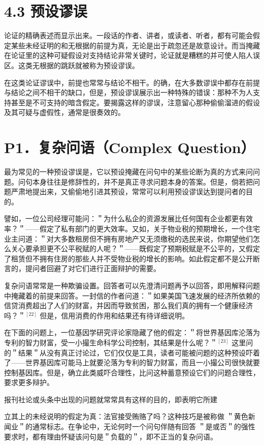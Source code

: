 \section*{4.3 预设谬误}
论证的精确表述而显示出来。一段话的作者、讲者，或读者、听者，都有可能会假定某些未经证明的和无根据的前提为真，无论是出于疏忽还是故意设计。而当掩藏在论证里的这种可疑假设对支持结论非常关键时，论证就是糟糕的并可使人陷人误区。这类无根据的跳跃就被称为预设谬误。

在这类论证谬误中，前提也常常与结论不相干。的确，在大多数谬误中都存在前提与结论之间不相干的缺口，但是，预设谬误展示出一种特殊的错误：那种不为人支持甚至是不可支持的暗含假定。要揭露这样的谬误，注意留心那种偷偷溜进的假设及其可疑与虚假性，通常是很奏效的。

\section*{P1．复杂问语（Complex Question）}
最为常见的一种预设谬误是，它以预设掩藏在问句中的某些论断为真的方式来问问题。问句本身往往是修辞性的，并不是真正寻求问题本身的答案。但是，倘若把问题严肃地提出来，又偷偷地引进其预设，常常可以利用预设谬误达到提问者的目的。

譬如，一位公司经理可能问：＂为什么私企的资源发展比任何国有企业都更有效率？＂——假定了私有部门的更大效率。又如，关于物业税的预期增长，一个住宅业主问道：＂对大多数租房但不拥有房地产又无须缴税的选民来说，你期望他们怎么关心要承担更不公平税赋的人呢？＂——既假定了预期税赋是不公平的，又假定了租赁但不拥有住房的那些人并不受物业税的增长的影响。如此假定都不是公开断言的，提问者回避了对它们进行正面辩护的需要。

复杂问语常常是一种欺骗设置。回答者可以先澄清问题再予以回答，即用解释问题中掩藏着的前提来回答。一封信的作者问道：＂如果美国飞速发展的经济所依赖的信贷消费超出了人们的财富，并因而导致贫困，那么我们真的拥有一个健康经济吗？＂${ }^{[22]}$ 但是，信用消费的作用和结果还有待详细说明。

在下面的问题上，一位基因学研究评论家隐藏了他的假定：＂将世界基因库沦落为专利的智力财富，受一小撮生命科学公司控制，其结果是什么呢？＂${ }^{[23]}$ 这里问的＂结果＂从没有真正讨论过，它们仅仅是工具，读者可能被问题的这种预设吓着了——世界基因库可能马上就要沦落为专利的智力财富，而且一小撮公司很快就要控制基因库。但是，确立此类威吓合理性，比问这种蓄意预设它们的问题合理性，要求更多辩护。

报刊社论或头条中出现的问题就常常具有这样的目的，即表明它所建

立其上的未经说明的假定为真：法官接受贿赂了吗？这种技巧是被称做 ＂黄色新闻业＂的通常标志。在争论中，无论何时一个问句伴随有回答 ＂是或否＂的强性要求时，都有理由怀疑该问句是＂负载的＂，即不正当的复杂问语。

